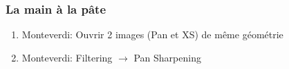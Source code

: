 \documentclass[compress]{beamer}
\begin{document}
\begin{frame}
\begin{columns}
\begin{column}{0.45\textwidth}
\end{column}
\end{columns}

\end{frame}

\begin{frame}
\frametitle{La main à la pâte}
\begin{enumerate}
\item Monteverdi: Ouvrir 2 images (Pan et XS) de même géométrie
\item Monteverdi: Filtering $\rightarrow$ Pan Sharpening
\end{enumerate}
\end{frame}
\end{document}
